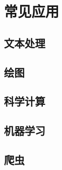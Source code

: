 \section{常见应用}

\subsection{文本处理}
\subsection{绘图}
\subsection{科学计算}
\subsection{机器学习}
\subsection{爬虫}

